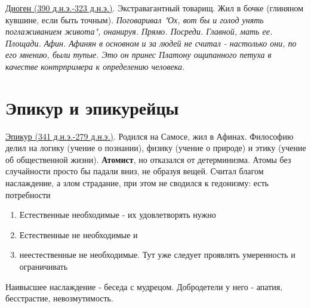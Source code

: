 \documentclass[12pt,a4paper]{article}
\begin{document}
\underline{Диоген (390 д.н.э.-323 д.н.э.)}. Экстравагантный товарищ. Жил в бочке (глиняном кувшине, если быть точным). \textit{Поговаривал "Ох, вот бы и голод унять поглаживанием живота", онанируя. Прямо. Посреди. Главной, мать ее. Площади. Афин. Афинян в основном и за людей не считал - настолько они, по его мнению, были тупые. Это он принес Платону ощипанного петуха в качестве контрпримера к определению человека.}


\section{Эпикур и эпикурейцы}

\underline{Эпикур (341 д.н.э.-279 д.н.э.)}. Родился на Самосе, жил в Афинах.
Философию делил на логику (учение о познании), физику (учение о природе) и этику (учение об общественной жизни). \textbf{Атомист}, но отказался от детерминизма. Атомы без случайности просто бы падали вниз, не образуя вещей. Считал благом наслаждение, а злом страдание, при этом не сводился к гедонизму: есть потребности
\begin{enumerate}
\item Естественные необходимые - их удовлетворять нужно
\item Естественные не необходимые и
\item неестественные не необходимые. Тут уже следует проявлять умеренность и ограничивать
\end{enumerate}
Наивысшее наслаждение - беседа с мудрецом. Добродетели у него - апатия, бесстрастие, невозмутимость.
\end{document}
